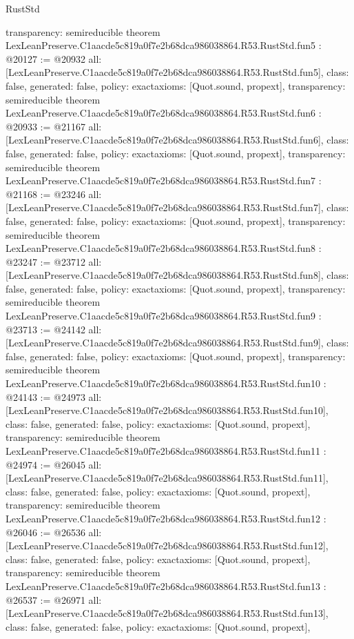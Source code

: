 \begin{lexlean}{RustStd}
\begin{coremodule}
{  transparency: semireducible
}
theorem LexLeanPreserve.C1aacde5c819a0f7e2b68dca986038864.R53.RustStd.fun5 : @20127 := @20932 {
  all: [LexLeanPreserve.C1aacde5c819a0f7e2b68dca986038864.R53.RustStd.fun5],
  class: false,
  generated: false,
  policy: exact{axioms: [Quot.sound, propext]},
  transparency: semireducible
}
theorem LexLeanPreserve.C1aacde5c819a0f7e2b68dca986038864.R53.RustStd.fun6 : @20933 := @21167 {
  all: [LexLeanPreserve.C1aacde5c819a0f7e2b68dca986038864.R53.RustStd.fun6],
  class: false,
  generated: false,
  policy: exact{axioms: [Quot.sound, propext]},
  transparency: semireducible
}
theorem LexLeanPreserve.C1aacde5c819a0f7e2b68dca986038864.R53.RustStd.fun7 : @21168 := @23246 {
  all: [LexLeanPreserve.C1aacde5c819a0f7e2b68dca986038864.R53.RustStd.fun7],
  class: false,
  generated: false,
  policy: exact{axioms: [Quot.sound, propext]},
  transparency: semireducible
}
theorem LexLeanPreserve.C1aacde5c819a0f7e2b68dca986038864.R53.RustStd.fun8 : @23247 := @23712 {
  all: [LexLeanPreserve.C1aacde5c819a0f7e2b68dca986038864.R53.RustStd.fun8],
  class: false,
  generated: false,
  policy: exact{axioms: [Quot.sound, propext]},
  transparency: semireducible
}
theorem LexLeanPreserve.C1aacde5c819a0f7e2b68dca986038864.R53.RustStd.fun9 : @23713 := @24142 {
  all: [LexLeanPreserve.C1aacde5c819a0f7e2b68dca986038864.R53.RustStd.fun9],
  class: false,
  generated: false,
  policy: exact{axioms: [Quot.sound, propext]},
  transparency: semireducible
}
theorem LexLeanPreserve.C1aacde5c819a0f7e2b68dca986038864.R53.RustStd.fun10 : @24143 := @24973 {
  all: [LexLeanPreserve.C1aacde5c819a0f7e2b68dca986038864.R53.RustStd.fun10],
  class: false,
  generated: false,
  policy: exact{axioms: [Quot.sound, propext]},
  transparency: semireducible
}
theorem LexLeanPreserve.C1aacde5c819a0f7e2b68dca986038864.R53.RustStd.fun11 : @24974 := @26045 {
  all: [LexLeanPreserve.C1aacde5c819a0f7e2b68dca986038864.R53.RustStd.fun11],
  class: false,
  generated: false,
  policy: exact{axioms: [Quot.sound, propext]},
  transparency: semireducible
}
theorem LexLeanPreserve.C1aacde5c819a0f7e2b68dca986038864.R53.RustStd.fun12 : @26046 := @26536 {
  all: [LexLeanPreserve.C1aacde5c819a0f7e2b68dca986038864.R53.RustStd.fun12],
  class: false,
  generated: false,
  policy: exact{axioms: [Quot.sound, propext]},
  transparency: semireducible
}
theorem LexLeanPreserve.C1aacde5c819a0f7e2b68dca986038864.R53.RustStd.fun13 : @26537 := @26971 {
  all: [LexLeanPreserve.C1aacde5c819a0f7e2b68dca986038864.R53.RustStd.fun13],
  class: false,
  generated: false,
  policy: exact{axioms: [Quot.sound, propext]},
}
\end{coremodule}
\end{lexlean}
